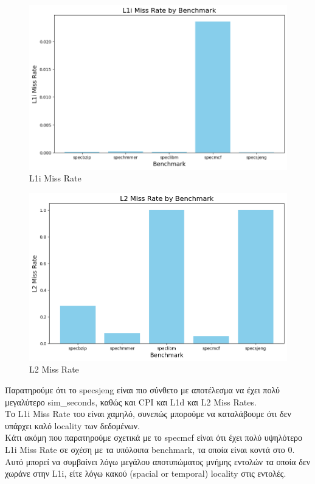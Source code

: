 \documentclass{article}
\begin{document}
\begin{figure}[H]
    \centering
    \includegraphics[width=16cm]{bench_metrics/l1i.png}
    \caption{L1i Miss Rate}
    \label{fig:enter-label}
\end{figure}

\begin{figure}[H]
    \centering
    \includegraphics[width=16cm]{bench_metrics/l2.png}
    \caption{L2 Miss Rate}
    \label{fig:enter-label}
\end{figure}

Παρατηρούμε ότι το specsjeng είναι πιο σύνθετο με αποτέλεσμα να έχει πολύ μεγαλύτερο sim\_seconds, καθώς και CPI και L1d και L2 Miss Rates. \\
Το L1i Miss Rate του είναι χαμηλό, συνεπώς μπορούμε να καταλάβουμε ότι δεν υπάρχει καλό locality των δεδομένων. \\
Κάτι ακόμη που παρατηρούμε σχετικά με το specmcf είναι ότι έχει πολύ υψηλότερο L1i Miss Rate σε σχέση με τα υπόλοιπα benchmark, τα οποία είναι κοντά στο 0. \\
Αυτό μπορεί να συμβαίνει λόγω μεγάλου αποτυπώματος μνήμης εντολών τα οποία δεν χωράνε στην L1i, είτε λόγω κακού (spacial or temporal) locality στις εντολές. \\
\end{document}
